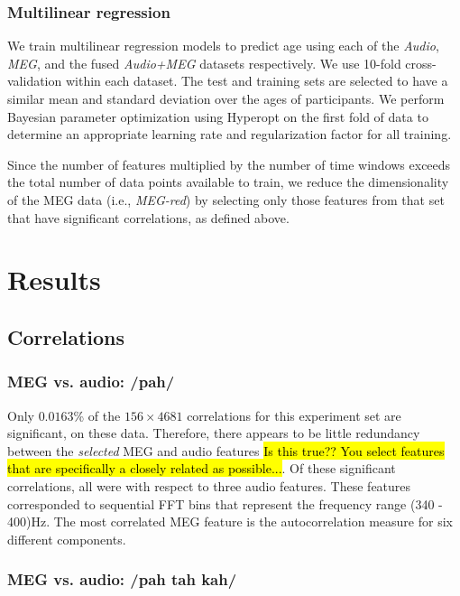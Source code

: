 \documentclass[a4paper]{article}
\newcommand{\FR}[1]{{\small \textcolor{red}{\hl{#1}}}}
\begin{document}
\subsubsection{Multilinear regression}

We train multilinear regression models to predict age using each of the \textit{Audio}, \textit{MEG}, and the fused \textit{Audio+MEG} datasets respectively. We use 10-fold cross-validation within each dataset. The test and training sets are selected to have a similar mean and standard deviation over the ages of participants. We perform Bayesian parameter optimization using Hyperopt \cite{Bergstra2013} on the first fold of data to determine an appropriate learning rate and regularization factor for all training. %

Since the number of features multiplied by the number of time windows exceeds the total number of data points available to train, we reduce the dimensionality of the MEG data (i.e., {\em MEG-red}) by selecting only those features from that set that have significant correlations, as defined above.

\section{Results}

\subsection{Correlations}

\subsubsection{MEG vs. audio: /pah/}

Only $0.0163$\% of the $156 \times 4681$ correlations for this experiment set are significant, on these data. Therefore, there appears to be little redundancy between the \textit{selected} MEG and audio features \FR{Is this true?? You select features that are specifically a closely related as possible...}. Of these significant correlations, all were with respect to three audio features. These features corresponded to sequential FFT bins that represent the frequency range (340 - 400)Hz. The most correlated MEG feature is the autocorrelation measure for six different components.

\subsubsection{MEG vs. audio: /pah tah kah/}
\end{document}
